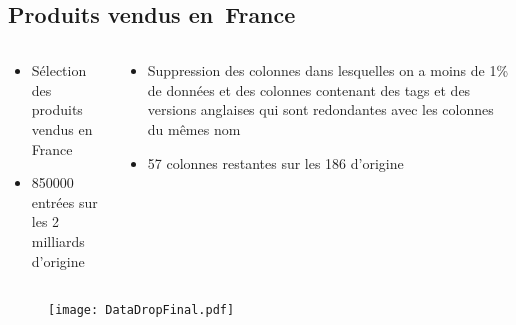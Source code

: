   \subsection{Produits vendus en France}
    \begin{frame}{\insertsubsection}
      \begin{columns}[T]
        \begin{column}{.4\textwidth}
          \begin{itemize}
            \item Sélection des produits vendus en France
            \item \num{850000} entrées sur les 2 milliards d'origine 
          \end{itemize}
        \end{column}
        \begin{column}{.6\textwidth}
          \begin{itemize}
            \item Suppression des colonnes dans lesquelles on a moins de 1\% de données 
et des colonnes contenant des tags et des versions anglaises qui sont redondantes avec les 
colonnes du mêmes nom
            \item 57 colonnes restantes sur les 186 d'origine
          \end{itemize}
        \end{column}
      \end{columns}
      \vfill
      \begin{figure}
        \texttt{[image: DataDropFinal.pdf]}
      \end{figure}
    \end{frame}
  
